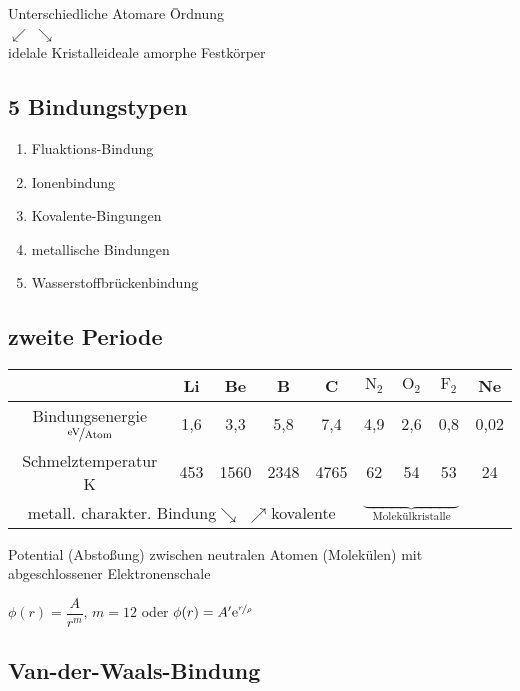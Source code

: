 \begin{tabbing}
\qquad Unterschiedliche Atomare \=Ordnung \\ 
 \qquad $\swarrow$ \> $\searrow$\qquad \\ 
 idelale Kristalle\>ideale amorphe Festkörper 
\end{tabbing} 


\subsection{5 Bindungstypen}
\begin{enumerate}
\item Fluaktions-Bindung
\item Ionenbindung
\item Kovalente-Bingungen
\item metallische Bindungen
\item Wasserstoffbrückenbindung
\end{enumerate}

\subsection{zweite Periode}
\begin{tabular}[b]{|c|c|c|c|c|c|c|c|c|}
\hline & Li & Be & B & C & $\text{N}_2$ & $\text{O}_2$ & $\text{F}_2$ & Ne \\ 
\hline Bindungsenergie $\nicefrac{\text{eV}}{\text{Atom}}$ & 1,6 & 3,3 & 5,8 & 7,4 & 4,9 & 2,6 & 0,8 & 0,02 \\ 
Schmelztemperatur K & 453 & 1560 & 2348 & 4765 & 62 & 54 & 53 & 24 \\ 
\hline\multicolumn{5}{c}{metall. charakter. Bindung$\searrow$ \quad $\nearrow$kovalente}  &\multicolumn{3}{c}{$\underbrace{\phantom{\qquad\qquad\qquad}}_{\text{Molekülkristalle}}$} \\ 
\end{tabular} 

Potential (Abstoßung) zwischen neutralen Atomen (Molekülen) mit abgeschlossener Elektronenschale


$\phi (r)=\dfrac{A}{r^m},\, m=12$ oder $\phi(r)=A^\prime \text{e}^{\nicefrac{r}{\rho}}$

\subsection{Van-der-Waals-Bindung}

